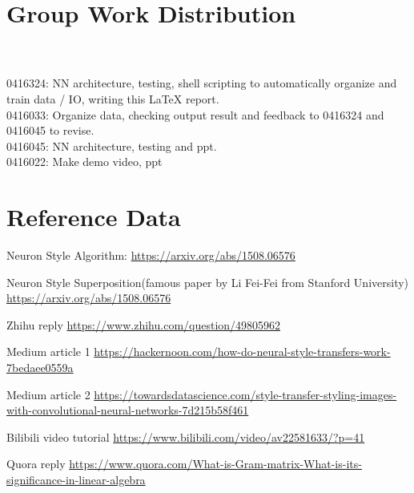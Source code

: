 \documentclass[11pt, a4paper]{article} %
\begin{document}
\section{Group Work Distribution}

\\
\\ 0416324: NN architecture, testing, shell scripting to automatically organize and train data / IO, writing this LaTeX report.
\\ 0416033: Organize data, checking output result and feedback to 0416324 and 0416045 to revise.
\\ 0416045: NN architecture, testing and ppt.
\\ 0416022: Make demo video, ppt
\section{Reference Data}
\item Neuron Style Algorithm: \url{https://arxiv.org/abs/1508.06576}
\item Neuron Style Superposition(famous paper by Li Fei-Fei from Stanford University) \url{https://arxiv.org/abs/1508.06576}
\item Zhihu reply \url{https://www.zhihu.com/question/49805962}
\item Medium article 1 \url{https://hackernoon.com/how-do-neural-style-transfers-work-7bedaee0559a}
\item Medium article 2 \url{https://towardsdatascience.com/style-transfer-styling-images-with-convolutional-neural-networks-7d215b58f461}
\item Bilibili video tutorial \url{https://www.bilibili.com/video/av22581633/?p=41}
\item Quora reply \url{https://www.quora.com/What-is-Gram-matrix-What-is-its-significance-in-linear-algebra}
\end{document}
